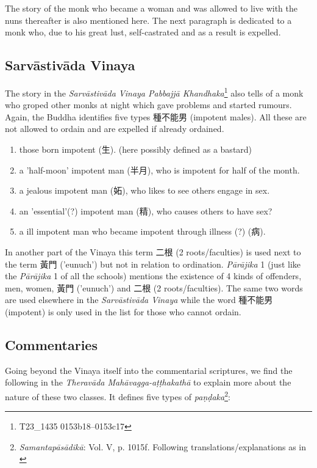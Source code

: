 The story of the monk who became a woman and was allowed to live with the nuns thereafter is also mentioned here. The next paragraph is dedicated to a monk who, due to his great lust, self-castrated and as a result is expelled.


\subsection{Sarvāstivāda Vinaya}
The story in the {\em Sarvāstivāda Vinaya Pabbajjā Khandhaka}\footnote{T23_1435 0153b18–0153c17} also tells of a monk who groped other monks at night which gave problems and started rumours. Again, the Buddha identifies five types 種不能男 (impotent males). All these are not allowed to ordain and are expelled if already ordained.

\begin{enumerate}
\item those born impotent (生). (here possibly defined as a bastard)
\item a 'half-moon' impotent man (半月), who is impotent for half of the month.
\item a jealous impotent man (妬), who likes to see others engage in sex.
\item an 'essential'(?) impotent man (精), who causes others to have sex?
\item a ill impotent man who became impotent through illness (?) (病).
\end{enumerate}

In another part of the Vinaya this term 二根 (2 roots/faculties) is used next to the term 黃門 ('eunuch') but not in relation to ordination. {\em Pārājika} 1 (just like the {\em Pārājika} 1 of all the schools) mentions the existence of 4 kinds of offenders, men, women, 黃門 ('eunuch') and 二根 (2 roots/faculties). The same two words are used elsewhere in the {\em Sarvāstivāda Vinaya} while the word 種不能男 (impotent) is only used in the list for those who cannot ordain.


\subsection{Commentaries}

Going beyond the Vinaya itself into the commentarial scriptures, we find the following in the {\em Theravāda Mahāvagga-aṭṭhakathā} to explain more about the nature of these two classes. It defines five types of {\em paṇḍaka}\footnote{{\em Samantapāsādikā}: Vol. V, p. 1015f. Following translations/explanations as in \cite{bomhard}}:

